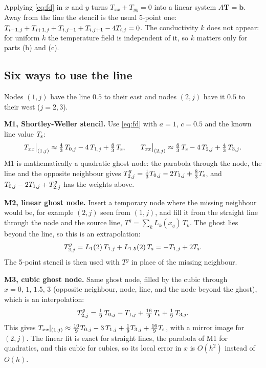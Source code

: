 Applying \eqref{eq:fd} in $x$ and $y$ turns $T_{xx}+T_{yy}=0$ into a linear system $A\mathbf T=\mathbf b$.
Away from the line the stencil is the usual 5-point one:
$T_{i-1,j}+T_{i+1,j}+T_{i,j-1}+T_{i,j+1}-4T_{i,j}=0$. The conductivity $k$ does not appear: for uniform $k$ the temperature
field is independent of it, so $k$ matters only for parts (b) and (c).

\subsection{Six ways to use the line}\label{sec:lines}

Nodes $(1,j)$ have the line $0.5$ to their east and nodes $(2,j)$ have it $0.5$ to their west ($j=2,3$).

\textbf{M1, Shortley-Weller stencil.} Use \eqref{eq:fd} with $a=1$, $c=0.5$ and the known line value $T_{\mathrm{s}}$:
\begin{equation}
  T_{xx}\big|_{(1,j)}\approx \tfrac43\,T_{0,j}-4\,T_{1,j}+\tfrac83\,T_{\mathrm{s}} ,\qquad
  T_{xx}\big|_{(2,j)}\approx \tfrac83\,T_{\mathrm{s}}-4\,T_{2,j}+\tfrac43\,T_{3,j} .
\end{equation}
M1 is mathematically a quadratic ghost node: the parabola through the node, the line and the opposite neighbour gives
$T^g_{2,j}=\tfrac13T_{0,j}-2T_{1,j}+\tfrac83T_{\mathrm{s}}$, and $T_{0,j}-2T_{1,j}+T^g_{2,j}$ has the weights above.

\textbf{M2, linear ghost node.} Insert a temporary node where the missing neighbour would be, for example $(2,j)$ seen from
$(1,j)$, and fill it from the straight line through the node and the source line, $T^g=\sum_k L_k(x_g)\,T_k$.
The ghost lies beyond the line, so this is an extrapolation:
\begin{equation}
  T^g_{2,j}= L_1(2)\,T_{1,j} + L_{1.5}(2)\,T_{\mathrm{s}} = -T_{1,j} + 2T_{\mathrm{s}} .
\end{equation}
The 5-point stencil is then used with $T^g$ in place of the missing neighbour.

\textbf{M3, cubic ghost node.} Same ghost node, filled by the cubic through $x=0,\,1,\,1.5,\,3$
(opposite neighbour, node, line, and the node beyond the ghost), which is an interpolation:
\begin{equation}
  T^g_{2,j}=\tfrac19\,T_{0,j}-T_{1,j}+\tfrac{16}{9}\,T_{\mathrm{s}}+\tfrac19\,T_{3,j} .
\end{equation}
This gives $T_{xx}|_{(1,j)}\approx\tfrac{10}{9}T_{0,j}-3\,T_{1,j}+\tfrac19T_{3,j}+\tfrac{16}{9}T_{\mathrm{s}}$, with a mirror image for $(2,j)$.
The linear fit is exact for straight lines, the parabola of M1 for quadratics, and this cubic for cubics, so its local error
in $x$ is $O(h^2)$ instead of $O(h)$.

